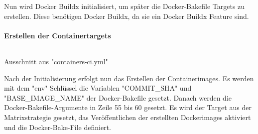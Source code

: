 Nun wird Docker Buildx initialisiert, um später die Docker-Bakefile Targets zu erstellen. Diese benötigen Docker Buildx, da sie ein Docker Buildx Feature sind. 

\paragraph{Erstellen der Containertargets}

\begin{listing}[H]
    \inputminted[firstline=50,lastline=60]{yaml}{./code-examples/containers-ci.yml}
    \caption{Ausschnitt aus "containers-ci.yml"}
    \label{lst:containers-ci-50-60}
\end{listing}

Nach der Initialisierung erfolgt nun das Erstellen der Containerimages. Es werden mit dem "env" Schlüssel die Variablen "COMMIT\_SHA" und "BASE\_IMAGE\_NAME" der Docker-Bakefile gesetzt. Danach werden die Docker-Bakefile-Argumente in Zeile 55 bis 60 gesetzt. Es wird der Target aus der Matrixstrategie gesetzt, das Veröffentlichen der erstellten Dockerimages aktiviert und die Docker-Bake-File definiert.
